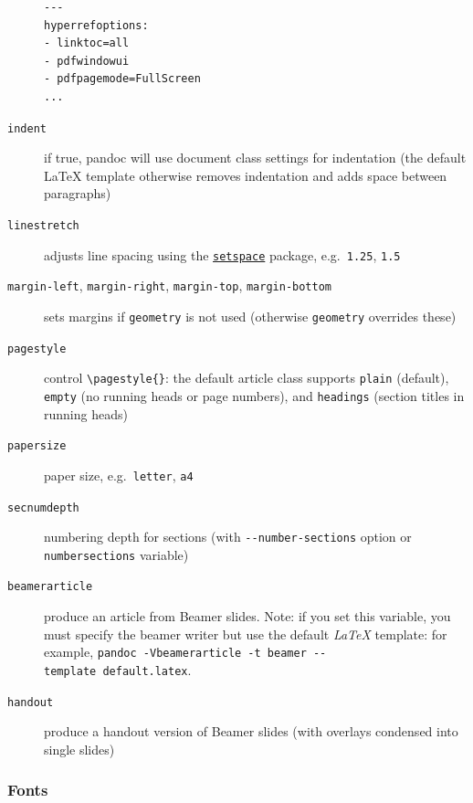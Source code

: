 \documentclass[
  b5paper
]{book}
\begin{document}
\begin{description}
\begin{verbatim}
---
hyperrefoptions:
- linktoc=all
- pdfwindowui
- pdfpagemode=FullScreen
...
\end{verbatim}
\item[\texttt{indent}]
if true, pandoc will use document class settings for indentation (the
default LaTeX template otherwise removes indentation and adds space
between paragraphs)
\item[\texttt{linestretch}]
adjusts line spacing using the
\href{https://ctan.org/pkg/setspace}{\texttt{setspace}} package,
e.g.~\texttt{1.25}, \texttt{1.5}
\item[\texttt{margin-left}, \texttt{margin-right}, \texttt{margin-top},
\texttt{margin-bottom}]
sets margins if \texttt{geometry} is not used (otherwise
\texttt{geometry} overrides these)
\item[\texttt{pagestyle}]
control \texttt{\textbackslash{}pagestyle\{\}}: the default article
class supports \texttt{plain} (default), \texttt{empty} (no running
heads or page numbers), and \texttt{headings} (section titles in running
heads)
\item[\texttt{papersize}]
paper size, e.g.~\texttt{letter}, \texttt{a4}
\item[\texttt{secnumdepth}]
numbering depth for sections (with \texttt{-\/-number-sections} option
or \texttt{numbersections} variable)
\item[\texttt{beamerarticle}]
produce an article from Beamer slides. Note: if you set this variable,
you must specify the beamer writer but use the default \emph{LaTeX}
template: for example,
\texttt{pandoc\ -Vbeamerarticle\ -t\ beamer\ -\/-template\ default.latex}.
\item[\texttt{handout}]
produce a handout version of Beamer slides (with overlays condensed into
single slides)
\end{description}

\subsubsection{Fonts}\label{fonts}
\end{document}
